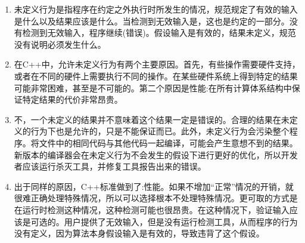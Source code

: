\begin{enumerate}
\item 
未定义行为是指程序在约定之外执行时所发生的情况，规范规定了有效的输入是什么以及结果应该是什么。当检测到无效输入是，这也是约定的一部分。没有检测到无效输入，程序继续(错误)。假设输入是有效的，结果未定义，规范没有说明必须发生什么。

\item 
在C++中，允许未定义行为有两个主要原因。首先，有些操作需要硬件支持，或者在不同的硬件上需要执行不同的操作。在某些硬件系统上得到特定的结果可能非常困难，甚至是不可能的。第二个原因是性能:在所有计算体系结构中保证特定结果的代价非常昂贵。

\item 
不，一个未定义的结果并不意味着这个结果一定是错误的。合理的结果在未定义的行为下也是允许的，只是不能保证而已。此外，未定义行为会污染整个程序。将文件中的相同代码与其他代码一起编译，可能会产生意想不到的结果。新版本的编译器会在未定义行为不会发生的假设下进行更好的优化，所以开发者应该运行杀灭工具，并修复工具报告出来的错误。

\item
出于同样的原因，C++标准做到了:性能。如果不增加“正常”情况的开销，就很难正确处理特殊情况，所以可以选择根本不处理特殊情况。更可取的方式是在运行时检测这种情况，这种检测可能也很昂贵。在这种情况下，验证输入应该是可选的。用户提供了无效输入，但是没有运行检测工具，从而程序的行为没有定义，因为算法本身假设输入是有效的，导致违背了这个假设。

\end{enumerate}